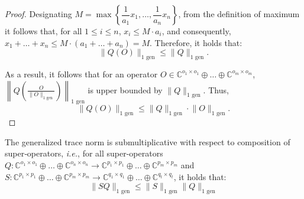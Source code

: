 \begin{proof}
    Designating $M = \max \left\{   \dfrac{1}{a_1} x_1  , \ldots , \dfrac{1}{a_n} x_n   \right\}$, from the definition of maximum it follows that, for all $1 \leq i \leq n$, $x_i \leq M \cdot a_i$, and consequently, $x_1 + \ldots + x_n \leq M \cdot (a_1 + \ldots + a_n) = M$. Therefore, it holds that:
    \begin{equation}
      \lVert Q(O) \rVert_{1 \text{ gen}} \leq  \lVert Q \rVert_{1 \text{ gen}}.
    \end{equation} 
  
    As a result, it follows that for an operator $O \in \mathbb{C}^{o_1 \times o_1} \oplus \ldots \oplus  \mathbb{C}^{o_m \times o_m}$,  $ \left\lVert Q\left(\frac{O}{\lVert O \rVert_{1 \text{ gen}}}\right)  \right\rVert_{1 \text{ gen}}$ is upper bounded by $\lVert Q  \rVert_{1 \text{ gen}}$. Thus, 
  \begin{equation}
    \lVert Q(O) \rVert_{1 \text{ gen}} \leq \lVert Q  \rVert_{1 \text{ gen}} \cdot \lVert O  \rVert_{1 \text{ gen}}.
  \end{equation}
  \end{proof}
  
  
  \begin{lemma}\label{lem:gen_trace_submultiplicative}
    The generalized trace norm is submultiplicative with respect to composition of super‑operators, \textit{i.e.}, for all super-operators $Q: \mathbb{C}^{o_1 \times o_1} \oplus \ldots \oplus \mathbb{C}^{o_n \times o_n}  \rightarrow \mathbb{C}^{p_1 \times p_1} \oplus \ldots \oplus  \mathbb{C}^{p_m \times p_m}$ and $S: \mathbb{C}^{p_1 \times p_1} \oplus \ldots \oplus \mathbb{C}^{p_m \times p_m}  \rightarrow \mathbb{C}^{q_1 \times q_1} \oplus \ldots \oplus \mathbb{C}^{q_t \times q_t}$, it holds that:
    \begin{equation} \label{eq:gen_trace_submultiplicative}
      \lVert S  Q \rVert_{1 \text{ gen}} \leq \lVert S \rVert_{1 \text{ gen}} \lVert Q \rVert_{1 \text{ gen}}
    \end{equation}
  \end{lemma}
  
